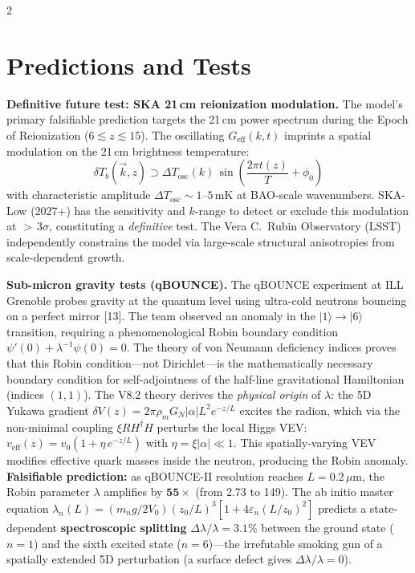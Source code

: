 \documentclass[11pt]{article}
\begin{document}
\begin{multicols}{2}

\section{Predictions and Tests}

\textbf{Definitive future test: SKA 21\,cm reionization modulation.} The model's primary falsifiable prediction targets the 21\,cm power spectrum during the Epoch of Reionization ($6 \lesssim z \lesssim 15$). The oscillating $G_\text{eff}(k,t)$ imprints a spatial modulation on the 21\,cm brightness temperature:
\begin{equation}
\delta T_b(\vec{k}, z) \supset \Delta T_\text{osc}(k)\, \sin\!\left(\frac{2\pi t(z)}{T} + \phi_0\right)
\end{equation}
with characteristic amplitude $\Delta T_\text{osc} \sim 1$--$5$\,mK at BAO-scale wavenumbers. SKA-Low (2027+) has the sensitivity and $k$-range to detect or exclude this modulation at ${>}\,3\sigma$, constituting a \textit{definitive} test. The Vera C.\ Rubin Observatory (LSST) independently constrains the model via large-scale structural anisotropies from scale-dependent growth.

\textbf{Sub-micron gravity tests (qBOUNCE).} The qBOUNCE experiment at ILL Grenoble probes gravity at the quantum level using ultra-cold neutrons bouncing on a perfect mirror [13]. The team observed an anomaly in the $|1\rangle \to |6\rangle$ transition, requiring a phenomenological Robin boundary condition $\psi'(0) + \lambda^{-1}\psi(0) = 0$. The theory of von Neumann deficiency indices proves that this Robin condition---not Dirichlet---is the mathematically necessary boundary condition for self-adjointness of the half-line gravitational Hamiltonian (indices $(1,1)$). The V8.2 theory derives the \textit{physical origin} of $\lambda$: the 5D Yukawa gradient $\delta V(z) = 2\pi\rho_m G_N |\alpha| L^2 e^{-z/L}$ excites the radion, which via the non-minimal coupling $\xi R H^\dagger H$ perturbs the local Higgs VEV: $v_\text{eff}(z) = v_0(1 + \eta\,e^{-z/L})$ with $\eta = \xi|\alpha| \ll 1$. This spatially-varying VEV modifies effective quark masses inside the neutron, producing the Robin anomaly. \textbf{Falsifiable prediction:} as qBOUNCE-II resolution reaches $L = 0.2\,\mu$m, the Robin parameter $\lambda$ amplifies by $\mathbf{55\times}$ (from 2.73 to 149). The ab initio master equation $\lambda_n(L) = (m_n g/2V_0)(z_0/L)^3[1+4\varepsilon_n(L/z_0)^2]$ predicts a state-dependent \textbf{spectroscopic splitting} $\Delta\lambda/\lambda = 3.1\%$ between the ground state ($n=1$) and the sixth excited state ($n=6$)---the irrefutable smoking gun of a spatially extended 5D perturbation (a surface defect gives $\Delta\lambda/\lambda = 0$).


\end{multicols}
\end{document}
